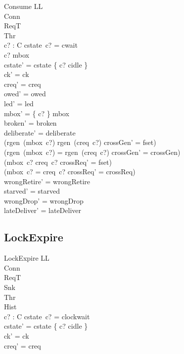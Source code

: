 \documentclass[a4paper,10pt,fleqn]{article}
\begin{document}
\begin{schema}{Consume}
  \Delta LL \\
  \Xi Conn \\
  \Xi ReqT \\
  \Xi Thr \\
  c? : C
\where
  cstate~c? = cwait \\
  c? \in \dom mbox \\
  cstate' = cstate \oplus \{ c? \mapsto cidle \} \\
  ck' = ck \\
  creq' = creq \\
  owed' = owed \\
  led' = led \\
  mbox' = \{ c? \} \ndres mbox \\
  broken' = broken \\
  deliberate' = deliberate \\
  (rgen~(mbox~c?) \neq rgen~(creq~c?) \implies crossGen' = fset) \\
  (rgen~(mbox~c?) = rgen~(creq~c?) \implies crossGen' = crossGen) \\
  (mbox~c? \neq creq~c? \implies crossReq' = fset) \\
  (mbox~c? = creq~c? \implies crossReq' = crossReq) \\
  wrongRetire' = wrongRetire \\
  starved' = starved \\
  wrongDrop' = wrongDrop \\
  lateDeliver' = lateDeliver
\end{schema}

\subsection{LockExpire}

\begin{schema}{LockExpire}
  \Delta LL \\
  \Xi Conn \\
  \Xi ReqT \\
  \Xi Snk \\
  \Xi Thr \\
  \Xi Hist \\
  c? : C
\where
  cstate~c? = clockwait \\
  cstate' = cstate \oplus \{ c? \mapsto cidle \} \\
  ck' = ck \\
  creq' = creq
\end{schema}
\end{document}
